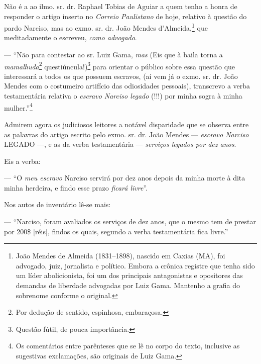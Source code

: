 {\asterisc{}

Não é a ao ilmo. sr. dr. Raphael Tobias de Aguiar a quem tenho a honra
de responder o artigo inserto no \emph{Correio Paulistano} de hoje,
relativo à questão do pardo Narciso, mas ao exmo. sr. dr. João Mendes
d'Almeida,\footnote{ João Mendes de Almeida (1831--1898), nascido em
  Caxias (MA), foi advogado, juiz, jornalista e político. Embora a
  crônica registre que tenha sido um líder abolicionista, foi um dos
  principais antagonistas e opositores das demandas de liberdade
  advogadas por Luiz Gama. Mantenho a grafia do sobrenome conforme o
  original.} que meditadamente o escreveu, \emph{como advogado}.

--- ``Não para contestar ao sr. Luiz Gama, \emph{mas} (Eis que à baila
torna a \emph{mamalhuda}\footnote{ Por dedução de sentido,
  espinhosa, embaraçosa.} questiúncula!)\footnote{ Questão fútil, de
  pouca importância.} para orientar o público sobre essa questão que
interessará a todos os que possuem escravos, (aí vem já o exmo. sr. dr.
João Mendes com o costumeiro artifício das odiosidades pessoais),
transcrevo a verba testamentária relativa o \emph{escravo Narciso
legado} (!!!) por minha sogra à minha mulher.''\footnote{ Os
  comentários entre parênteses que se lê no corpo do texto, inclusive as
  sugestivas exclamações, são originais de Luiz Gama.}

Admirem agora os judiciosos leitores a notável disparidade que se
observa entre as palavras do artigo escrito pelo exmo. sr. dr. João
Mendes --- \emph{escravo Narciso} LEGADO ---, e as da verba
testamentária --- \emph{serviços legados por dez anos}.

Eis a verba:

--- ``O \emph{meu escravo} Narciso servirá por dez anos depois da minha
morte à dita minha herdeira, e findo esse prazo \emph{ficará livre}''.

Nos autos de inventário lê-se mais:

--- ``Narciso, foram avaliados os serviços de dez anos, que o mesmo tem
de prestar por 200\$ {[}réis{]}, findos os quais, segundo a verba
testamentária fica livre.''

}
